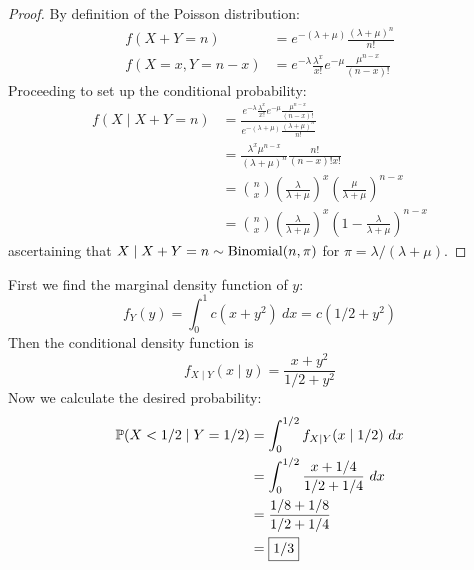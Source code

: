 \documentclass[a4paper]{article}
\begin{document}
\begin{proof}[Proof] 
By definition of the Poisson distribution:
\begin{align*}
	f(X+Y = n) & = e^{-(\lambda + \mu)} \frac{(\lambda + \mu)^n}{n!} \\
	f(X = x, Y = n-x) & = e^{-\lambda } \frac{\lambda^{x}}{x!} e^{-\mu} \frac{\mu^{n-x}}{(n-x)!}
\end{align*}
Proceeding to set up the conditional probability:
\begin{align*}
	f(X  \mid  X + Y = n) & = \frac{e^{-\lambda } \frac{\lambda^{x}}{x!} e^{-\mu} \frac{\mu^{n-x}}{(n-x)!}}{e^{-(\lambda + \mu)} \frac{(\lambda + \mu)^n}{n!}} \\
			 & = \frac{\lambda^{x} \mu^{n-x}}{(\lambda + \mu)^{n}} \frac{n!}{(n-x)!x!} \\
			 & = \binom{n}{x} \left( \frac{\lambda }{\lambda + \mu} \right)^{x} \left( \frac{\mu}{\lambda + \mu} \right)^{n-x} \\
			 & = \binom{n}{x} \left( \frac{\lambda }{\lambda + \mu} \right)^{x} \left( 1 - \frac{\lambda }{\lambda + \mu} \right)^{n-x}  
\end{align*}
ascertaining that \(X  \mid  X + Y = n \sim \operatorname{Binomial}(n,\pi )\) for \(\pi = \lambda / (\lambda + \mu)\).
\end{proof}


First we find the marginal density function of \(y\):
\[
	f_{Y}(y) = \int^{1}_{0} c(x+y^{2}) \ dx = c(1/2 + y^{2})
\]
Then the conditional density function is
\[
	f_{X \mid Y}(x \mid y) = \frac{x + y^{2}}{1/2 + y^{2}}
\]
Now we calculate the desired probability:
\begin{align*}
	\mathbb{P}(X < 1/2  \mid  Y = 1/2) & = \int^{1/2}_{0}  f_{X \mid Y}(x  \mid  1/2) \ dx  \\
	 & = \int^{1/2}_{0} \frac{x + 1/4}{1/2 + 1/4} \ dx  \\
	 & = \frac{1/8 + 1/8}{1/2 + 1/4} \\
	 & = \boxed{1/3}
\end{align*}
\end{document}
